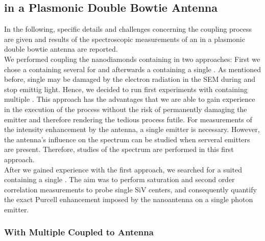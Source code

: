 			\subsection{\siv in a Plasmonic Double Bowtie Antenna}


				In the following, specific details and challenges concerning the coupling process are given and results of the spectroscopic measurements of an \siv in a plasmonic double bowtie antenna are reported.
				\\
				We performed coupling the nanodiamonds containing \sivs in two approaches:
				First we chose a \nd containing several \sivs for \pp and afterwards a \nd containing a single \siv.
				As mentioned before, single \sivs may be damaged by the electron radiation in the SEM during \pp and stop emittig \pl light.
				Hence, we decided to run first experiments with \nds containing multiple \sivs.
				This approach has the advantages that we are able to gain experience in the execution of the \pp process without the risk of permanently damaging the emitter and therefore rendering the tedious \pp process futile.
				For measurements of the intensity enhancement by the antenna, a single emitter is necessary.
				However, the antenna's influence on the \siv spectrum can be studied when serveral emitters are present.
				Therefore, studies of the spectrum are performed in this first approach.
				\\
				After we gained experience with the first approach, we  searched for a suited \nd containing a single \siv.
				The aim was to perform saturation and second order correlation measurements to probe single SiV centers, and consequently quantify the exact Purcell enhancement imposed by the nanoantenna on a single photon emitter.



				\subsubsection{\Nd With Multiple \sivs Coupled to Antenna}\label{subsubsection::antenna_multiple_sivs}

